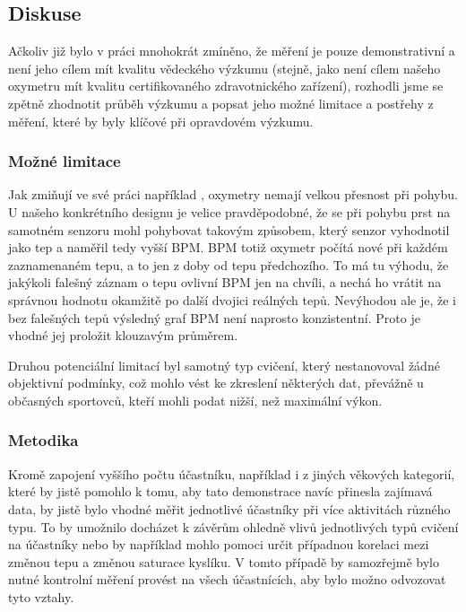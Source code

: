 \subsection{Diskuse}
Ačkoliv již bylo v práci mnohokrát zmíněno, že měření je pouze demonstrativní a není jeho cílem mít kvalitu vědeckého výzkumu (stejně, jako není cílem našeho oxymetru mít kvalitu certifikovaného zdravotnického zařízení), rozhodli jsme se zpětně zhodnotit průběh výzkumu a popsat jeho možné limitace a postřehy z měření, které by byly klíčové při opravdovém výzkumu.
\subsubsection{Možné limitace}
Jak zmiňují ve své práci například \cite{monitoring}, oxymetry nemají velkou přesnost při pohybu. U našeho konkrétního designu je velice pravděpodobné, že se při pohybu prst na samotném senzoru mohl pohybovat takovým způsobem, který senzor vyhodnotil jako tep a naměřil tedy vyšší BPM. BPM totiž oxymetr počítá nové při každém zaznamenaném tepu, a to jen z doby od tepu předchozího. To má tu výhodu, že jakýkoli falešný záznam o tepu ovlivní BPM jen na chvíli, a nechá ho vrátit na správnou hodnotu okamžitě po další dvojici reálných tepů. Nevýhodou ale je, že i bez falešných tepů výsledný graf BPM není naprosto konzistentní. Proto je vhodné jej proložit klouzavým průměrem.
\par Druhou potenciální limitací byl samotný typ cvičení, který nestanovoval žádné objektivní podmínky, což mohlo vést ke zkreslení některých dat, převážně u občasných sportovců, kteří mohli podat nižší, než maximální výkon.
\subsubsection{Metodika}
Kromě zapojení vyššího počtu účastníku, například i z jiných věkových kategorií, které by jistě pomohlo k tomu, aby tato demonstrace navíc přinesla zajímavá data, by jistě bylo vhodné měřit jednotlivé účastníky při více aktivitách různého typu. To by umožnilo docházet k závěrům ohledně vlivů jednotlivých typů cvičení na účastníky nebo by například mohlo pomoci určit případnou korelaci mezi změnou tepu a změnou saturace kyslíku. V tomto případě by samozřejmě bylo nutné kontrolní měření provést na všech účastnících, aby bylo možno odvozovat tyto vztahy.
